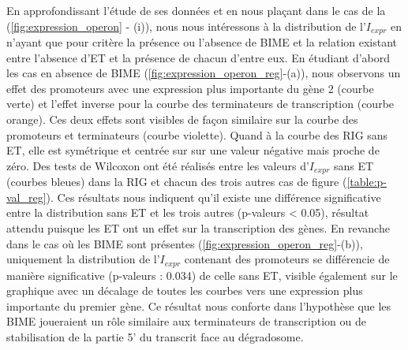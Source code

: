 \documentclass[12pt,a4paper]{report}
\begin{document}
\begin{onehalfspace}
En approfondissant l'étude de ses données et en nous plaçant dans le cas de la (\autoref{fig:expression_operon} - (i)), nous nous intéressons à la distribution de l'$I_{expr}$ en n'ayant que pour critère la présence ou l'absence de BIME et la relation existant entre l'absence d'ET et la présence de chacun d'entre eux. En étudiant d'abord les cas en absence de BIME (\autoref{fig:expression_operon_reg}-(a)), nous observons un effet des promoteurs avec une expression plus importante du gène 2 (courbe verte) et l'effet inverse pour la courbe des terminateurs de transcription (courbe orange). Ces deux effets sont visibles de façon similaire sur la courbe des promoteurs et terminateurs (courbe violette). Quand à la courbe des RIG sans ET, elle est symétrique et centrée sur sur une valeur négative mais proche de zéro. Des tests de Wilcoxon ont été réalisés entre les valeurs d'$I_{expr}$ sans ET (courbes bleues) dans la RIG et chacun des trois autres cas de figure (\autoref{table:p-val_reg}). Ces résultats nous indiquent qu'il existe une différence significative entre la distribution sans ET et les trois autres (p-valeurs < 0.05), résultat attendu puisque les ET ont un effet sur la transcription des gènes. En revanche dans le cas où les BIME sont présentes (\autoref{fig:expression_operon_reg}-(b)), uniquement la distribution de l'$I_{expr}$ contenant des promoteurs se différencie de manière significative (p-valeurs : 0.034) de celle sans ET, visible également sur le graphique avec un décalage de toutes les courbes vers une expression plus importante du premier gène. Ce résultat nous conforte dans l'hypothèse que les BIME joueraient un rôle similaire aux terminateurs de transcription ou de stabilisation de la partie 5' du transcrit face au dégradosome.


\end{onehalfspace}
\end{document}

